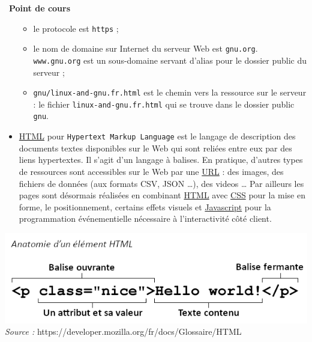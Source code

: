 \documentclass[
  11pt,
]{article}
\newcommand{\passthrough}[1]{#1}
\providecommand{\tightlist}{%
  \setlength{\itemsep}{0pt}\setlength{\parskip}{0pt}}
\newcounter{cours}
\newenvironment{cours}[1]
{\par \medskip   \addtocounter{cours}{1} \noindent  
\begin{bclogo}[arrondi =0.1,  ombre = true, barre=none, logo=\bcbook, marge=4]{~\textbf{Point de cours} \textbf{\thecours} {\itshape #1} }  \par}
{
\end{bclogo}
 \par \bigskip }
\newcounter{prog}
\begin{document}
\begin{cours}{}
\begin{itemize}
  \begin{itemize}
  \tightlist
  \item
    le protocole est \passthrough{\lstinline!https!} ;
  \item
    le nom de domaine sur Internet du serveur Web est
    \passthrough{\lstinline!gnu.org!}.\\
    \passthrough{\lstinline!www.gnu.org!} est un sous-domaine servant
    d'alias pour le dossier public du serveur ;
  \item
    \passthrough{\lstinline!gnu/linux-and-gnu.fr.html!} est le chemin
    vers la ressource sur le serveur : le fichier
    \passthrough{\lstinline!linux-and-gnu.fr.html!} qui se trouve dans
    le dossier public \passthrough{\lstinline!gnu!}.
  \end{itemize}
\item
  \href{https://developer.mozilla.org/fr/docs/Glossaire/HTML}{HTML} pour
  \passthrough{\lstinline!Hypertext Markup Language!} est le langage de
  description des documents textes disponibles sur le Web qui sont
  reliées entre eux par des liens hypertextes. Il s'agit d'un langage à
  balises. En pratique, d'autres types de ressources sont accessibles
  sur le Web par une
  \href{https://developer.mozilla.org/fr/docs/Glossaire/URL}{URL} : des
  images, des fichiers de données (aux formats CSV, JSON \ldots), des
  videos \ldots{} Par ailleurs les pages sont désormais réalisées en
  combinant
  \href{https://developer.mozilla.org/fr/docs/Glossaire/HTML}{HTML} avec
  \href{https://developer.mozilla.org/fr/docs/Glossaire/CSS}{CSS} pour
  la mise en forme, le positionnement, certains effets visuels et
  \href{https://developer.mozilla.org/fr/docs/Glossaire/JavaScript}{Javascript}
  pour la programmation événementielle nécessaire à l'interactivité côté
  client.
\end{itemize}

\includegraphics[width=1\textwidth,height=\textheight]{images/anatomie-element-html.png}\\

\emph{Source :} https://developer.mozilla.org/fr/docs/Glossaire/HTML

\end{cours}
\end{document}

